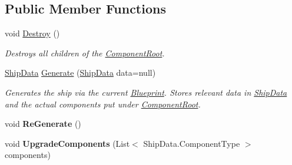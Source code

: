 \subsection*{Public Member Functions}
\begin{DoxyCompactItemize}
\item 
void \hyperlink{class_skyrates_1_1_ship_1_1_ship_generator_a90a28b98dee78c230ad12e75417bc97f}{Destroy} ()
\begin{DoxyCompactList}\small\item\em Destroys all children of the \hyperlink{class_skyrates_1_1_ship_1_1_ship_generator_a040b9432f06173ddce445b14fdd42c9a}{Component\-Root}. \end{DoxyCompactList}\item 
\hyperlink{class_skyrates_1_1_ship_1_1_ship_data}{Ship\-Data} \hyperlink{class_skyrates_1_1_ship_1_1_ship_generator_a98648e2db2bd204cd7a470df9f8745d5}{Generate} (\hyperlink{class_skyrates_1_1_ship_1_1_ship_data}{Ship\-Data} data=null)
\begin{DoxyCompactList}\small\item\em Generates the ship via the current \hyperlink{class_skyrates_1_1_ship_1_1_ship_generator_a97b0d9ba683bd4ea383f01ef96348d5a}{Blueprint}. Stores relevant data in \hyperlink{class_skyrates_1_1_ship_1_1_ship_data}{Ship\-Data} and the actual components put under \hyperlink{class_skyrates_1_1_ship_1_1_ship_generator_a040b9432f06173ddce445b14fdd42c9a}{Component\-Root}. \end{DoxyCompactList}\item 
\hypertarget{class_skyrates_1_1_ship_1_1_ship_generator_aa07941574bf573545893795aa290a66e}{void {\bfseries Re\-Generate} ()}\label{class_skyrates_1_1_ship_1_1_ship_generator_aa07941574bf573545893795aa290a66e}

\item 
\hypertarget{class_skyrates_1_1_ship_1_1_ship_generator_af3eee129392586d627fb598d9ab9ec72}{void {\bfseries Upgrade\-Components} (List$<$ Ship\-Data.\-Component\-Type $>$ components)}\label{class_skyrates_1_1_ship_1_1_ship_generator_af3eee129392586d627fb598d9ab9ec72}

\end{DoxyCompactItemize}
